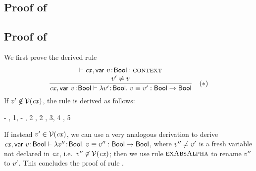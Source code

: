 \subsection*{Proof of }

\begin{derivation}
\end{derivation}



\subsection*{Proof of }

We first prove the derived rule
\[
\frac{\begin{array}{c}\vdash\mathit{cx},\mathsf{var}\ v\!:\!\mathsf{Bool}:\textsc{context}\\v'\neq v\end{array}}{\mathit{cx},\mathsf{var}\ v\!:\!\mathsf{Bool}\vdash\lambda v'\!:\!\mathsf{Bool}.\;v\equiv v':\mathsf{Bool}\to\mathsf{Bool}}\quad\mbox{($\ast$)}
\]
If $v'\not\in\mathcal{V}(\mathit{cx})$, the rule is derived as follows:
\begin{derivation}
\step{\cxwf{\snoc{\cx}{\vdec{\var}{\bool}}}}
     {\hyp}
     {\Rcxvdecbool, 1, \hyp}
     {\Revar, 2}
     {\Revar, 2}
     {\Reeq, 3, 4}
     {\Reabs, 5}
\end{derivation}
If instead $v'\in\mathcal{V}(\mathit{cx})$, we can use a very analogous derivation to
derive
$\mathit{cx},\mathsf{var}\ v\!:\!\mathsf{Bool}\vdash\lambda v''\!:\!\mathsf{Bool}.\;v\equiv v'':\mathsf{Bool}\to\mathsf{Bool}$,
where $v''\neq v'$ is a fresh variable not declared in $\mathit{cx}$, i.e.\
$v''\not\in\mathcal{V}(\mathit{cx})$; then we use rule $\textsc{exAbsAlpha}$ to rename $v''$
to $v'$. This concludes the proof of rule \RtmpI.

